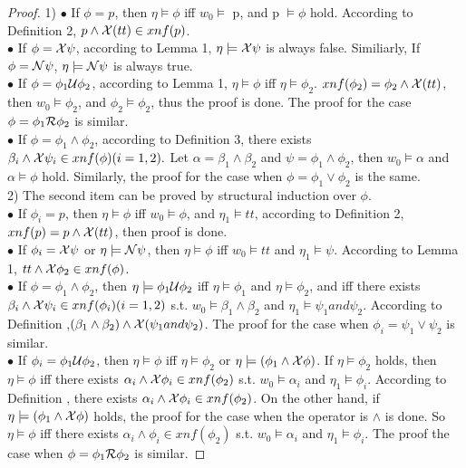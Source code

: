 \begin{proof}
1) $\bullet$ If $\phi = p$, then $\eta \models \phi$ iff $w_0 \models$ p, and p $\models \phi$ hold. According to Definition 2, $p \wedge \mathcal{X}(tt) \in xnf(p)$.\\
$\bullet$ If $\phi=\mathcal{X} \psi$, according to Lemma 1, $\eta \models \mathcal{X} \psi$ is always false. Similiarly, If $\phi=\mathcal{N} \psi$, $\eta \models \mathcal{N} \psi$ is always true.\\
$\bullet$ If $\phi=\phi_{1} \mathcal{U} \phi_{2}$, according to Lemma 1, $\eta \models \phi$ iff $\eta \models \phi_{2}$. $xnf(\phi_{2})=\phi_{2} \wedge \mathcal{X}(tt)$, then  $w_0 \models \phi_{2}$, and $\phi_{2} \models \phi_{2}$, thus the proof is done. The proof for the case $\phi=\phi_{1} \mathcal{R} \phi_{2}$ is similar. \\
$\bullet$ If $\phi=\phi_{1} \wedge \phi_{2}$, according to Definition 3, there exists $\beta_i \wedge \mathcal{X}\psi_i \in xnf(\phi)(i = 1,2).$ Let $\alpha = \beta_1 \wedge \beta_2$ and $\psi = \phi_1 \wedge \phi_2$, then $w_0 \models \alpha$ and $\alpha \models \phi$ hold. Similarly, the proof for the case when $\phi = \phi_1 \vee \phi_2$ is the same. \\
2) The second item can be proved by structural induction over $\phi$.\\
 $\bullet$ If $\phi_i = p$, then $\eta \models \phi$ iff $w_0 \models \phi$, and $\eta_1 \models tt$, according to Definition 2, $xnf(p)=p \wedge \mathcal{X}(tt)$, then proof is done.\\
 $\bullet$ If $\phi_i=\mathcal{X} \psi$ or $\eta \models \mathcal{N} \psi$, then $\eta \models \phi$ iff $w_0 \models tt$ and $\eta_1 \models \psi$. According to Lemma 1, $tt \wedge \mathcal{X}\phi_2 \in xnf(\phi)$.\\
$\bullet$ If $\phi=\phi_1 \wedge \phi_2$, then $\eta \models \phi_1 \mathcal{U} \phi_2$ iff $\eta \models \phi_1$ and $\eta \models \phi_2$, and iff there exists $\beta_i \wedge \mathcal{X}\psi_i \in xnf(\phi_i)(i=1,2)$ s.t. $w_0 \models \beta_1 \wedge \beta_2$ and $\eta_1 \models \psi_1 and \psi_2$. According to Definition ,$(\beta_1 \wedge \beta_2)\wedge \mathcal{X}(\psi_1 and \psi_2)$. The proof for the case when $\phi_i=\psi_{1} \vee \psi_{2}$ is similar. \\
 $\bullet$ If $\phi_i=\phi_{1} \mathcal{U} \phi_{2}$, then $\eta \models \phi$ iff $\eta \models \phi_2$ or $\eta \models (\phi_1 \wedge \mathcal{X}\phi)$. If $\eta \models \phi_2$ holds, then $\eta \models \phi$ iff there exists $\alpha_i \wedge \mathcal{X}\phi_i \in xnf(\phi_2)$ s.t. $w_0 \models \alpha_i$ and $\eta_1 \models \phi_i$. According to Definition , there exists $\alpha_i \wedge \mathcal{X}\phi_i \in xnf(\phi_2)$. On the other hand, if $\eta \models (\phi_1 \wedge \mathcal{X}\phi)$ holds, the proof for the case when the operator is $\wedge$ is done. So $\eta \models \phi$ iff there exists $\alpha_i \wedge \phi_i \in xnf(\phi_2)$ s.t. $w_0 \models \alpha_i$ and $\eta_1 \models \phi_i$. The proof the case when $\phi=\phi_1 \mathcal{R} \phi_2$ is similar.
\end{proof}
